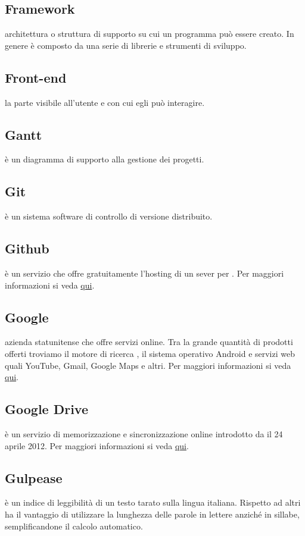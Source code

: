 \documentclass[12pt,a4paper]{article}
\begin{document}
\subsection{Framework} 
 architettura o struttura di supporto su cui un programma può essere creato. In genere è composto da una serie di librerie e strumenti di sviluppo.

\subsection{Front-end} 
la parte visibile all'utente e con cui egli può interagire.


\newpage

\subsection{Gantt} 
 è un diagramma di supporto alla gestione dei progetti.

\subsection{Git} 
 è un sistema software di controllo di versione distribuito.

\subsection{Github} 
 è un servizio che offre gratuitamente l'hosting di un sever per . Per maggiori informazioni si veda \href{https://github.com}{qui}.

\subsection{Google} 
 azienda statunitense che offre servizi online. Tra la grande quantità di prodotti offerti troviamo il motore di ricerca , il sistema operativo Android e servizi web quali YouTube, Gmail, Google Maps e altri. Per maggiori informazioni si veda \href{https://it.wikipedia.org/wiki/Google_Inc.}{qui}.

\subsection{Google Drive} 
 è un servizio di memorizzazione e sincronizzazione online introdotto da  il 24 aprile 2012. Per maggiori informazioni si veda \href{https://it.wikipedia.org/wiki/Google_Drive}{qui}.

\subsection{Gulpease} 
 è un indice di leggibilità di un testo tarato sulla lingua italiana. Rispetto ad altri ha il vantaggio di utilizzare la lunghezza delle parole in lettere anziché in sillabe, semplificandone il calcolo automatico.
\end{document}
